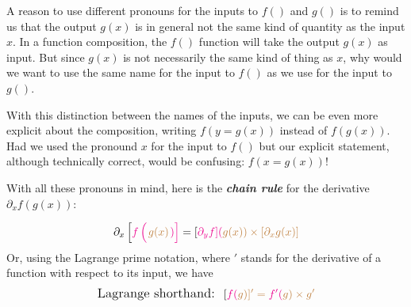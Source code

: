 \documentclass[
  letterpaper,
  DIV=11,
  numbers=noendperiod,
  oneside]{scrreprt}
\begin{document}
A reason to use different pronouns for the inputs to \(f()\) and \(g()\)
is to remind us that the output \(g(x)\) is in general not the same kind
of quantity as the input \(x\). In a function composition, the \(f()\)
function will take the output \(g(x)\) as input. But since \(g(x)\) is
not necessarily the same kind of thing as \(x\), why would we want to
use the same name for the input to \(f()\) as we use for the input to
\(g()\).

With this distinction between the names of the inputs, we can be even
more explicit about the composition, writing \(f(y=g(x))\) instead of
\(f(g(x))\). Had we used the pronound \(x\) for the input to \(f()\) but
our explicit statement, although technically correct, would be
confusing: \(f(x = g(x))\)!

With all these pronouns in mind, here is the \textbf{\emph{chain rule}}
for the derivative \(\partial_x f(g(x))\):

\[\large\partial_x \left[\strut \color{magenta}{f\left(\strut\right.}\strut \color{brown}{g(x)}\color{magenta}{\left.\right)}\right] = [\color{magenta}{\partial_y f}](\color{brown}{g(x)}) \times [\color{brown}{\partial_xg(x)}]\]
Or, using the Lagrange prime notation, where \('\) stands for the
derivative of a function with respect to its input, we have
\[\large\text{Lagrange shorthand:}\ \   [\color{magenta}f(\color{brown}g)]' = \color{magenta}{f'} (\color{brown}g) \times \color{brown}{g}'\]
\end{document}
